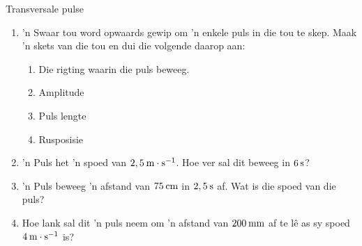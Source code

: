 \begin{eocexercises}{Transversale pulse}
            \nopagebreak
      \label{m38802*id316647}\begin{enumerate}[noitemsep, label=\textbf{\arabic*}. ] 
            \label{m38802*uid66}\item 'n Swaar tou word opwaards gewip om 'n enkele puls in die tou te skep. Maak 'n skets van die tou en dui die volgende daarop aan:
\label{m38802*id316663}\begin{enumerate}[noitemsep, label=\textbf{\alph*}. ] 
\item Die rigting waarin die puls beweeg.
\item Amplitude
\item Puls lengte
\item Rusposisie
\end{enumerate}

\item 'n Puls het 'n spoed van $2,5\phantom{\rule{2pt}{0ex}}\text{m}\ensuremath{\cdot}\text{s}{}^{-1}$. Hoe ver sal dit beweeg in $6\phantom{\rule{2pt}{0ex}}\text{s}$?\newline
\item 'n Puls beweeg 'n afstand van $75\phantom{\rule{2pt}{0ex}}\text{cm}$ in $2,5\phantom{\rule{2pt}{0ex}}\text{s}$ af. Wat is die spoed van die puls?\newline
\item Hoe lank sal dit 'n puls neem om 'n afstand van $200\phantom{\rule{2pt}{0ex}}\text{mm}$ af te l\^{e} as sy spoed $4\phantom{\rule{2pt}{0ex}}\text{m}\ensuremath{\cdot}\text{s}{}^{-1}$ is?\newline


\end{enumerate}
\end{eocexercises}
